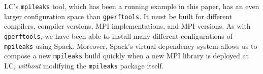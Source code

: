 LC's {\tt mpileaks} tool, which has been a running example in this paper,
has an even larger configuration space than {\tt gperftools}.  It must be built
for different compilers, compiler versions, MPI implementations, and MPI
versions. As with {\tt gperftools}, we have been able to install many different
configurations of {\tt mpileaks} using Spack.  Moreover, Spack's virtual dependency
system allows us to compose a new {\tt mpileaks} build quickly when a new MPI library is
deployed at LC, {\it without} modifying the {\tt mpileaks} package itself.
